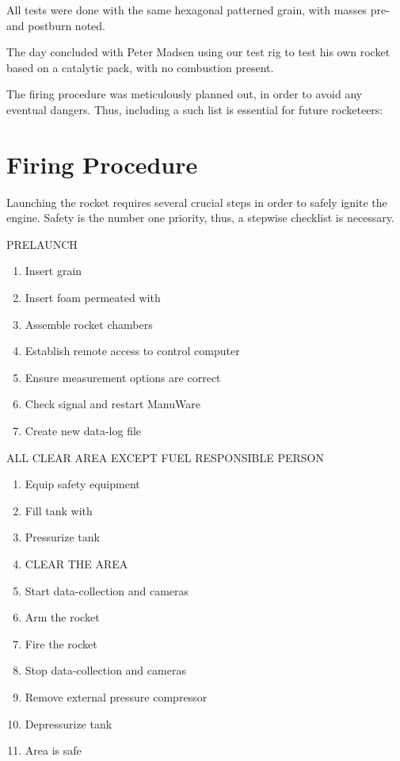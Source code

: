 All tests were done with the same hexagonal patterned grain, with masses pre- and postburn noted.

The day concluded with Peter Madsen using our test rig to test his own rocket based on a catalytic pack, with no combustion present.

The firing procedure was meticulously planned out, in order to avoid any eventual dangers. Thus, including a such list is essential for future rocketeers:

\section{Firing Procedure}
Launching the rocket requires several crucial steps in order to safely ignite the engine. Safety is the number one priority, thus, a stepwise checklist is necessary.

PRELAUNCH
\begin{enumerate}
  \itemsep0em
  \item Insert grain
  \item Insert foam permeated with 
  \item Assemble rocket chambers
  \item Establish remote access to control computer
  \item Ensure measurement options are correct
  \item Check signal and restart ManuWare
  \item Create new data-log file
\end{enumerate}
ALL CLEAR AREA EXCEPT FUEL RESPONSIBLE PERSON
\begin{enumerate}
  \itemsep0em
  \item Equip  safety equipment
  \item Fill tank with 
  \item Pressurize tank
  \item CLEAR THE AREA
  \item Start data-collection and cameras
  \item Arm the rocket
  \item Fire the rocket
  \item Stop data-collection and cameras
  \item Remove external pressure compressor
  \item Depressurize tank
  \item Area is safe
\end{enumerate}

